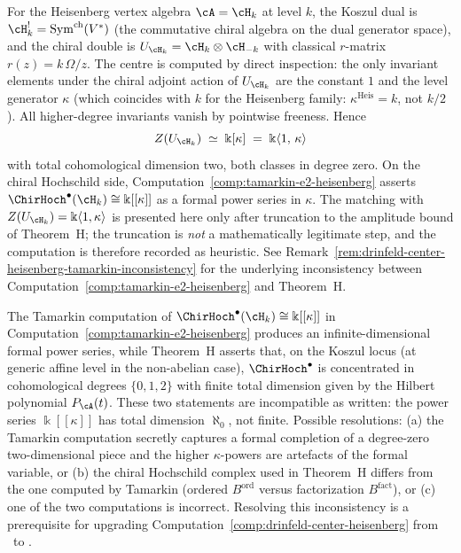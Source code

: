 \begin{computation}
\label{comp:drinfeld-center-heisenberg}
For the Heisenberg vertex algebra $\cA = \cH_k$ at level $k$, the
Koszul dual is $\cH_k^! = \mathrm{Sym}^{\mathrm{ch}}(V^*)$ (the commutative chiral algebra on the dual
generator space), and the chiral double is $U_{\cH_k} = \cH_k \otimes \cH_{-k}$
with classical $r$-matrix $r(z) = k\,\Omega/z$. The centre is computed by direct inspection:
the only invariant elements under the chiral adjoint action of $U_{\cH_k}$
are the constant $1$ and the level generator $\kappa$ (which coincides
with $k$ for the Heisenberg family: $\kappa^{\mathrm{Heis}} = k$,
not $k/2$). All higher-degree invariants vanish by pointwise freeness.
Hence
\begin{equation}
Z(U_{\cH_k}) \;\simeq\; \Bbbk[\kappa]
\;=\; \Bbbk\langle 1,\,\kappa\rangle
\end{equation}
with total cohomological dimension two, both classes in degree zero.
On the chiral Hochschild side,
Computation~\textup{\ref{comp:tamarkin-e2-heisenberg}} asserts
$\ChirHoch^\bullet(\cH_k) \cong \Bbbk[[\kappa]]$ as a formal power
series in $\kappa$. The matching with
$Z(U_{\cH_k}) = \Bbbk\langle 1,\kappa\rangle$ is presented here only
after truncation to the amplitude bound of Theorem~H; the truncation
is \emph{not} a mathematically legitimate step, and the computation is
therefore recorded as heuristic. See
Remark~\ref{rem:drinfeld-center-heisenberg-tamarkin-inconsistency} for
the underlying inconsistency between
Computation~\ref{comp:tamarkin-e2-heisenberg} and Theorem~H.
\end{computation}

\begin{remark}
\label{rem:drinfeld-center-heisenberg-tamarkin-inconsistency}
The Tamarkin computation of
$\ChirHoch^\bullet(\cH_k) \cong \Bbbk[[\kappa]]$ in
Computation~\ref{comp:tamarkin-e2-heisenberg} produces an infinite-dimensional
formal power series, while Theorem~H asserts that, on the Koszul
locus \textup{(}at generic affine level in the non-abelian
case\textup{)}, $\ChirHoch^\bullet$ is concentrated in
cohomological degrees $\{0,1,2\}$ with finite total dimension
given by the Hilbert polynomial $P_{\cA}(t)$. These two statements
are incompatible as written: the power series $\Bbbk[[\kappa]]$ has
total dimension $\aleph_0$, not finite.
Possible resolutions: (a) the Tamarkin computation secretly captures a
formal completion of a degree-zero two-dimensional piece and the higher
$\kappa$-powers are artefacts of the formal variable, or (b) the
chiral Hochschild complex used in Theorem~H differs from the one computed
by Tamarkin (ordered $B^{\mathrm{ord}}$ versus factorization $B^{\mathrm{fact}}$), or (c) one of the two computations is incorrect. Resolving this
inconsistency is a prerequisite for upgrading
Computation~\ref{comp:drinfeld-center-heisenberg} from
\ClaimStatusHeuristic\ to \ClaimStatusProvedHere.
\end{remark}

